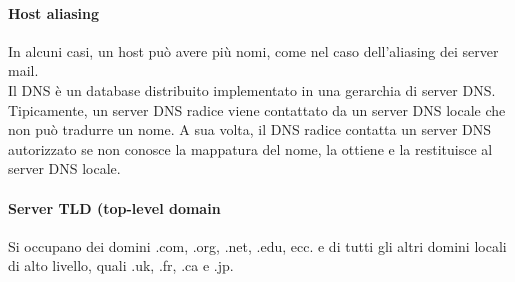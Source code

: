\documentclass{report}
\begin{document}
	\paragraph{Host aliasing} In alcuni casi, un host può avere più nomi, come nel caso dell'aliasing dei server mail.
	\medskip\\Il DNS è un database distribuito implementato in una gerarchia di server DNS. Tipicamente, un server DNS radice viene contattato da un server DNS locale che non può tradurre un nome. A sua volta, il DNS radice contatta un server DNS autorizzato se non conosce la mappatura del nome, la ottiene e la restituisce al server DNS locale.
	\paragraph{Server TLD (top-level domain} Si occupano dei domini .com, .org, .net, .edu, ecc. e di tutti gli altri domini locali di alto livello, quali .uk, .fr, .ca e .jp.
\end{document}
